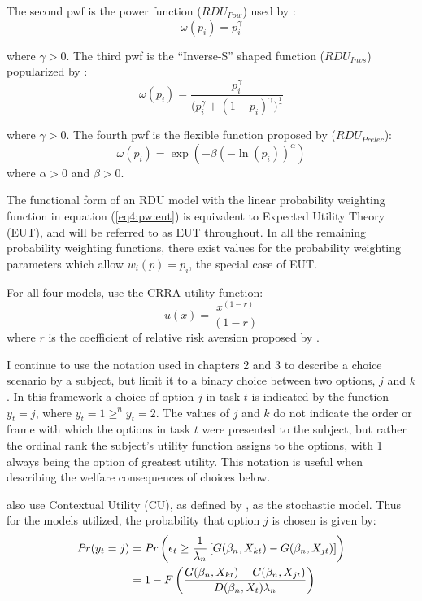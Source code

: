 \documentclass[../main.tex]{subfiles}
\begin{document}
\noindent The second pwf is the power function ($\mathit{RDU_{Pow}}$) used by \textcite{Quiggin1982}:
\begin{equation}
	\label{eq4:pw:pow}
	\omega(p_i)=p_i^\gamma
\end{equation}

\noindent where $\gamma > 0$. 
The third pwf is the \enquote{Inverse-S} shaped function ($\mathit{RDU_{Invs}}$) popularized by \textcite{Tversky1992}:
\begin{equation}
	\label{eq4:pw:inv}
	\omega(p_i) = \frac{p_i^\gamma}{\biggl(p_i^\gamma + {(1-p_i)}^\gamma\biggr)^{ \frac{1}{\gamma} } }
\end{equation}

\noindent where $\gamma > 0$. 
The fourth pwf is the flexible function proposed by \textcite{Prelec1998} ($\mathit{RDU_{Prelec}}$):
\begin{equation}
	\label{eq4:pw:pre}
	\omega(p_i)=\exp(-\beta(-\ln(p_i))^\alpha)
\end{equation}
\noindent where $\alpha > 0$ and $\beta > 0$.

The functional form of an RDU model with the linear probability weighting function in equation (\ref{eq4:pw:eut}) is equivalent to Expected Utility Theory (EUT), and will be referred to as EUT throughout.
In all the remaining probability weighting functions, there exist values for the probability weighting parameters which allow $w_i(p) = p_i$, the special case of EUT.

For all four models, \textcite{Harrison2016} use the CRRA utility function:
\begin{equation}
	\label{eq4:CRRA}
	u(x) = \frac{x^{(1-r)}}{(1-r)}
\end{equation}
\noindent where $r$ is the coefficient of relative risk aversion proposed by \textcite{Pratt1964}.

I continue to use the notation used in chapters 2 and 3 to describe a choice scenario by a subject, but limit it to a binary choice between two options, $j$ and $k$.
In this framework a choice of option $j$ in task $t$ is indicated by the function $y_t = j$, where $y_t = 1 \geq^n y_t = 2$.
The values of $j$ and $k$ do not indicate the order or frame with which the options in task $t$ were presented to the subject, but rather the ordinal rank the subject's utility function assigns to the options, with 1 always being the option of greatest utility.
This notation is useful when describing the welfare consequences of choices below.

\textcite{Harrison2016} also use Contextual Utility (CU), as defined by \textcite{Wilcox2008}, as the stochastic model.
Thus for the models utilized, the probability that option $j$ is chosen is given by:
\begin{align}
	\label{eq4:RE.2}
	\begin{split}
		{\ensuremath{\mathit{Pr}}}(y_t = j) &= {\mathit{Pr}}\left(  \epsilon_t \geq \frac{1}{\lambda_n} \left[ G(\beta_n,X_{kt}) - G(\beta_n,X_{jt}) \right] \right)\\
		&= 1 - F\left( \dfrac{G(\beta_n,X_{kt}) - G(\beta_n,X_{jt})}{D(\beta_n,X_t)\lambda_n }  \right)
	\end{split}
\end{align}
\end{document}
